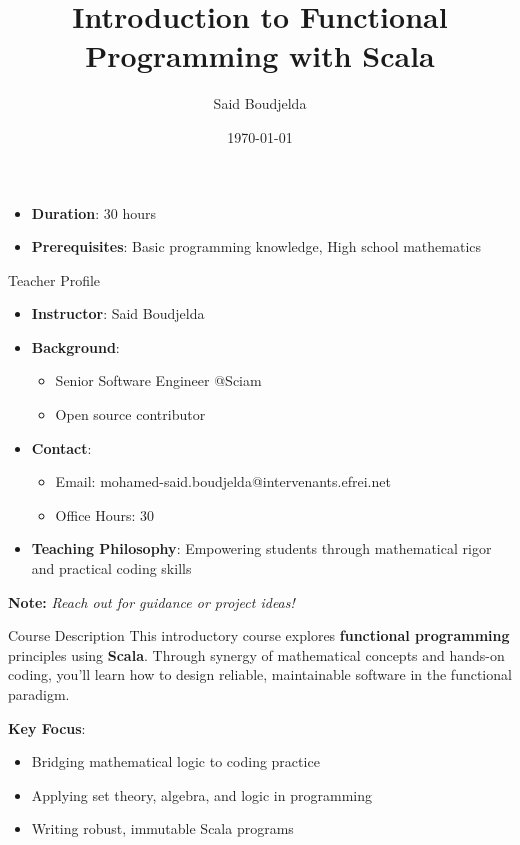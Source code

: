\documentclass{beamer}
\title{Introduction to Functional Programming with Scala}
\author{Said Boudjelda}
\institute{efrei}
\date{\today}
\newcommand{\note}[1]{\vspace{0.5em}\textbf{Note:} \textit{#1}}
\begin{document}
\begin{frame}
\titlepage
\begin{itemize}
    \item \textbf{Duration}: 30 hours
    \item \textbf{Prerequisites}: Basic programming knowledge, High school mathematics
\end{itemize}
\end{frame}

\begin{frame}{Teacher Profile}
\begin{itemize}
    \item \textbf{Instructor}: Said Boudjelda
    \item \textbf{Background}:
    \begin{itemize}
        \item Senior Software Engineer @Sciam 
        \item Open source contributor
    \end{itemize}
    \item \textbf{Contact}:
    \begin{itemize}
        \item Email: mohamed-said.boudjelda@intervenants.efrei.net
        \item Office Hours: 30
    \end{itemize}
    \item \textbf{Teaching Philosophy}: Empowering students through mathematical rigor and practical coding skills
\end{itemize}

\note{Reach out for guidance or project ideas!}
\end{frame}

\begin{frame}{Course Description}
This introductory course explores \textbf{functional programming} principles using \textbf{Scala}. Through synergy of mathematical concepts and hands-on coding, you'll learn how to design reliable, maintainable software in the functional paradigm.

\vspace{0.5em}
\textbf{Key Focus}:
\begin{itemize}
    \item Bridging mathematical logic to coding practice
    \item Applying set theory, algebra, and logic in programming
    \item Writing robust, immutable Scala programs
\end{itemize}
\end{frame}
\end{document}

